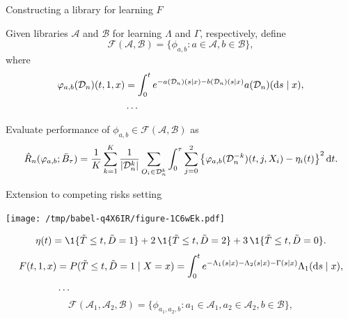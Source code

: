 \documentclass[smaller]{beamer}\usepackage{listings}
\begin{document}
\begin{frame}[label={sec:org392cea0}]{Constructing a library for learning \(F\)}
\small

Given libraries \( \mathcal{A} \) and \( \mathcal{B} \) for learning $\Lambda$
and $\Gamma$, respectively,  define
\begin{equation*}
  \mathcal{F}(\mathcal{A}, \mathcal{B})
  = \{ \phi_{a, b} : a \in \mathcal{A}, b \in \mathcal{B}\},
\end{equation*}
where
\begin{align*}
  \varphi_{a, b}(\mathcal{D}_n)(t,1,x) &= \int_0^t e^{-a(\mathcal{D}_n)(s \mid
    x) -
    b(\mathcal{D}_n)(s \mid x) }  a(\mathcal{D}_n)(\mathop{}\!\mathrm{d} s \mid x),
  \\
  & \dots 
\end{align*}

\vfill

Evaluate performance of
\( \phi_{a, b} \in \mathcal{F}(\mathcal{A}, \mathcal{B}) \) as
\begin{equation*}
  \hat{R}_n(\varphi_{a, b}; \bar{B}_{\tau}) =
  \frac{1}{K}\sum_{k=1}^{K}
  \frac{1}{| \mathcal{D}_n^{k} |}\sum_{O_i \in \mathcal{D}_n^{k}}
  \int_0^{\tau} \sum_{j=0}^{2} 
  \left\{
    \varphi_{a, b}(\mathcal{D}_n^{-k})(t,j, X_i) - \eta_i(t)
  \right\}^2 \mathop{}\!\mathrm{d} t.
\end{equation*}
\end{frame}

\begin{frame}[label={sec:orgfde3b31}]{Extension to competing risks setting}
\small

\begin{center}
\texttt{[image: /tmp/babel-q4X6IR/figure-1C6wEk.pdf]}
\end{center}

\begin{equation*}
  \eta(t) = \1{\{\tilde{T} \leq t, \tilde{D} = 1\}} +
  2 \, \1{\{\tilde{T} \leq t, \tilde{D} = 2\}}
  +
  3 \, \1{\{\tilde{T} \leq t, \tilde{D} = 0\}}.
\end{equation*}
\begin{align*}
  F(t, 1, x)
  & = P(\tilde{T} \leq t, \tilde{D}=1 \mid X=x)
    = \int_0^t e^{-\Lambda_1(s \mid x) -\Lambda_2(s \mid x) - \Gamma(s \mid x) }  \Lambda_1(\mathop{}\!\mathrm{d} s \mid x),
  \\
  & \dots
\end{align*}
\begin{equation*}
  \mathcal{F}(\mathcal{A}_1,\mathcal{A}_2, \mathcal{B})
  = \{ \phi_{a_1, a_2, b} : a_1 \in \mathcal{A}_1, a_2 \in \mathcal{A}_2, b \in \mathcal{B}\},
\end{equation*}
\end{frame}
\end{document}
